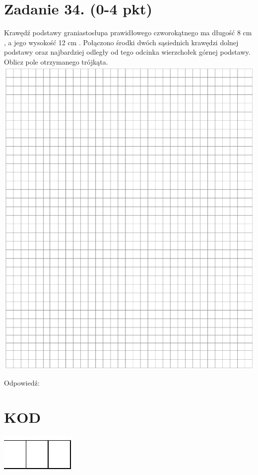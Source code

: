 \documentclass[10pt]{article}
\begin{document}
\section*{Zadanie 34. (0-4 pkt)}
Krawędź podstawy graniastosłupa prawidłowego czworokątnego ma długość 8 cm , a jego wysokość 12 cm . Połączono środki dwóch sąsiednich krawędzi dolnej podstawy oraz najbardziej odległy od tego odcinka wierzchołek górnej podstawy. Oblicz pole otrzymanego trójkąta.\\
\includegraphics[max width=\textwidth, center]{2024_11_21_832f1bc2b626663f1df2g-17}

Odpowiedź:

\section*{KOD}
\begin{center}
\includegraphics[max width=\textwidth]{2024_11_21_832f1bc2b626663f1df2g-18}
\end{center}
\end{document}
